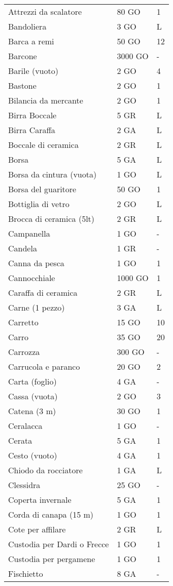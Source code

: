 \documentclass[12pt,a4paper,twoside,openany]{book}
\begin{document}
\begin{multicols}{2}
{\begin{tabularx}{0.42\textwidth}{lll}
Attrezzi da scalatore & 80 GO& 1\\
Bandoliera & 3 GO & L\\
Barca a remi &  50 GO  & 12\\
Barcone & 3000 GO  & -\\
Barile (vuoto)& 2 GO& 4\\
Bastone & 2 GO& 1\\
Bilancia da mercante  & 2 GO& 1\\
Birra Boccale& 5 GR& L\\
Birra Caraffa& 2 GA& L\\
Boccale di ceramica & 2 GR& L\\
Borsa&5 GA&L\\
Borsa da cintura (vuota) & 1 GO& L\\
Borsa del guaritore& 50 GO  & 1\\
Bottiglia di vetro  & 2 GO& L \\
Brocca di ceramica  (5lt) & 2 GR& L\\
Campanella  & 1 GO& - \\
Candela & 1 GR& -\\
Canna da pesca & 1 GO&1\\
Cannocchiale  & 1000 GO  & 1 \\
Caraffa di ceramica & 2 GR& L\\
Carne (1 pezzo) & 3 GA& L\\
Carretto  & 15 GO  & 10\\
Carro & 35 GO& 20\\
Carrozza  & 300 GO & -\\
Carrucola e paranco & 20 GO& 2 \\
Carta (foglio)& 4 GA& -\\
Cassa (vuota) & 2 GO& 3 \\
Catena (3 m)  & 30 GO & 1\\
Ceralacca& 1 GO& -\\
Cerata&5 GA&1\\
Cesto (vuoto) & 4 GA& 1 \\
Chiodo da rocciatore& 1 GA&L\\
Clessidra& 25 GO  & -\\
Coperta invernale & 5 GA& 1 \\
Corda di canapa (15 m)& 1 GO& 1\\
Cote per affilare & 2 GR& L \\
Custodia per Dardi o Frecce  & 1 GO& 1 \\
Custodia per pergamene  & 1 GO& 1 \\
Fischietto  & 8 GA& - \\

\end{tabularx}}
\end{multicols}
\end{document}
